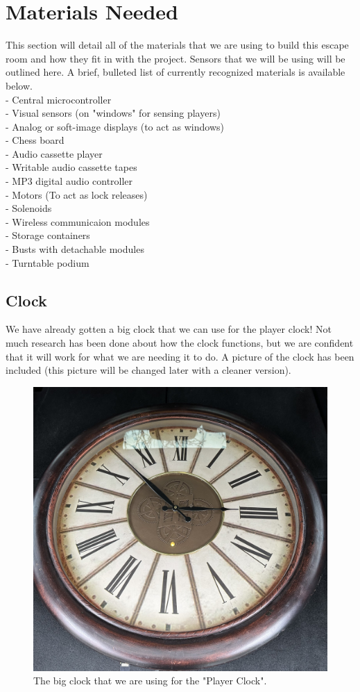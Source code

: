 \documentclass[conference]{IEEEtran}
\begin{document}
\section{Materials Needed}
This section will detail all of the materials that we are using to build this escape room and how they fit in with the project.
Sensors that we will be using will be outlined here. A brief, bulleted list of currently recognized materials is available below.
\\
- Central microcontroller\\
- Visual sensors (on "windows" for sensing players)\\
- Analog or soft-image displays (to act as windows)\\
- Chess board\\
- Audio cassette player\\
\indent - Writable audio cassette tapes\\
- MP3 digital audio controller\\
- Motors (To act as lock releases)\\
- Solenoids\\
- Wireless communicaion modules\\
- Storage containers\\
- Busts with detachable modules\\
- Turntable podium\\

\subsection*{Clock}
We have already gotten a big clock that we can use for the player clock! Not much
research has been done about how the clock functions, but we are confident that it will
work for what we are needing it to do. A picture of the clock has been included (this
picture will be changed later with a cleaner version).

\begin{figure}[ht]
    \centering
    \includegraphics[width=0.85\columnwidth]{Images/big-clock.jpg}
    \caption{The big clock that we are using for the "Player Clock".}
\end{figure}
\end{document}
